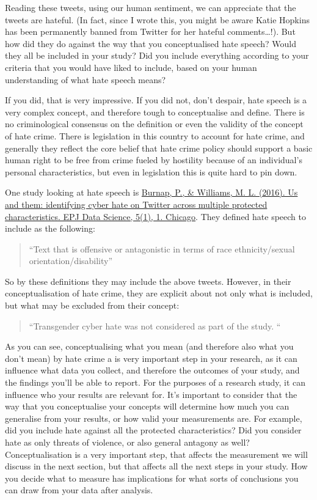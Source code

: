 \documentclass[
]{book}
\begin{document}
Reading these tweets, using our human sentiment, we can appreciate that the tweets are hateful. (In fact, since I wrote this, you might be aware Katie Hopkins has been permanently banned from Twitter for her hateful comments\ldots!). But how did they do against the way that you conceptualised hate speech? Would they all be included in your study? Did you include everything according to your criteria that you would have liked to include, based on your human understanding of what hate speech means?

If you did, that is very impressive. If you did not, don't despair, hate speech is a very complex concept, and therefore tough to conceptualise and define. There is no criminological consensus on the definition or even the validity of the concept of hate crime. There is legislation in this country to account for hate crime, and generally they reflect the core belief that hate crime policy should support a basic human right to be free from crime fueled by hostility because of an individual's personal characteristics, but even in legislation this is quite hard to pin down.

One study looking at hate speech is \href{https://epjdatascience.springeropen.com/articles/10.1140/epjds/s13688-016-0072-6}{Burnap, P., \& Williams, M. L. (2016). Us and them: identifying cyber hate on Twitter across multiple protected characteristics. EPJ Data Science, 5(1), 1. Chicago}. They defined hate speech to include as the following:

\begin{quote}
``Text that is offensive or antagonistic in terms of race ethnicity/sexual orientation/disability''
\end{quote}

So by these definitions they may include the above tweets. However, in their conceptualisation of hate crime, they are explicit about not only what is included, but what may be excluded from their concept:

\begin{quote}
``Transgender cyber hate was not considered as part of the study. ``
\end{quote}

As you can see, conceptualising what you mean (and therefore also what you don't mean) by hate crime a is very important step in your research, as it can influence what data you collect, and therefore the outcomes of your study, and the findings you'll be able to report. For the purposes of a research study, it can influence who your results are relevant for. It's important to consider that the way that you conceptualise your concepts will determine how much you can generalise from your results, or how valid your measurements are. For example, did you include hate against all the protected characteristics? Did you consider hate as only threats of violence, or also general antagony as well? Conceptualisation is a very important step, that affects the measurement we will discuss in the next section, but that affects all the next steps in your study. How you decide what to measure has implications for what sorts of conclusions you can draw from your data after analysis.
\end{document}
